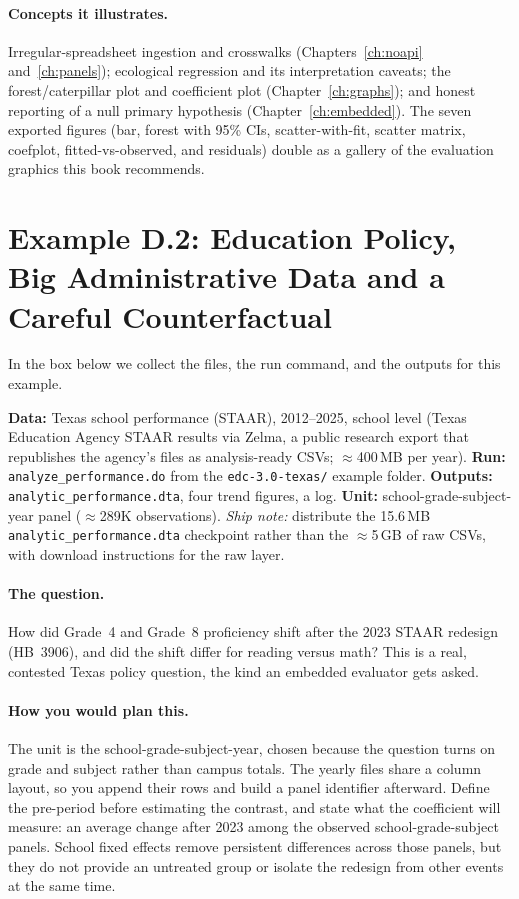 \documentclass[
    a4paper,
    fontsize=10pt,
    twoside=true,
    numbers=noenddot,
]{kaobook}
\begin{document}
\paragraph{Concepts it illustrates.} Irregular-spreadsheet ingestion and crosswalks (Chapters~\ref{ch:noapi} and~\ref{ch:panels}); ecological regression and its interpretation caveats; the forest/caterpillar plot and coefficient plot (Chapter~\ref{ch:graphs}); and honest reporting of a null primary hypothesis (Chapter~\ref{ch:embedded}). The seven exported figures (bar, forest with 95\% CIs, scatter-with-fit, scatter matrix, coefplot, fitted-vs-observed, and residuals) double as a gallery of the evaluation graphics this book recommends.

\section*{Example D.2: Education Policy, Big Administrative Data and a Careful Counterfactual}
In the box below we collect the files, the run command, and the outputs for this example.
\begin{kaobox}[frametitle=Get the files: \texttt{edc-3.0-texas/}]
\textbf{Data:} Texas school performance (STAAR), 2012--2025, school level (Texas Education Agency STAAR results via Zelma, a public research export that republishes the agency's files as analysis-ready CSVs; $\approx$400\,MB per year).
\textbf{Run:} \texttt{analyze\_performance.do} from the \texttt{edc-3.0-texas/} example folder. \textbf{Outputs:} \texttt{analytic\_performance.dta}, four trend figures, a log.
\textbf{Unit:} school-grade-subject-year panel ($\approx$289K observations). \emph{Ship note:} distribute the 15.6\,MB \texttt{analytic\_performance.dta} checkpoint rather than the $\approx$5\,GB of raw CSVs, with download instructions for the raw layer.
\end{kaobox}

\paragraph{The question.} How did Grade~4 and Grade~8 proficiency shift after the 2023 STAAR redesign (HB~3906), and did the shift differ for reading versus math? This is a real, contested Texas policy question, the kind an embedded evaluator gets asked.

\paragraph{How you would plan this.} The unit is the school-grade-subject-year, chosen because the question turns on grade and subject rather than campus totals. The yearly files share a column layout, so you append their rows and build a panel identifier afterward. Define the pre-period before estimating the contrast, and state what the coefficient will measure: an average change after 2023 among the observed school-grade-subject panels. School fixed effects remove persistent differences across those panels, but they do not provide an untreated group or isolate the redesign from other events at the same time.
\end{document}
